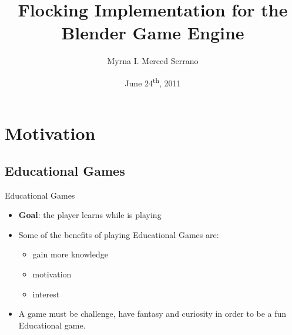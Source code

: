 \documentclass[red]{beamer}
\title[Flocking Implementation for the Blender Game Engine]{Flocking Implementation for the Blender Game Engine}
\author{Myrna I. Merced Serrano}
\institute{\textbf{Adviser:} Dr. Gordon Erlebacher}
\date{June 24\textsuperscript{th}, 2011}
\begin{document}
\begin{frame}
	\titlepage
\end{frame}

\begin{frame}
	\tableofcontents
\end{frame}

\section{Motivation}

\subsection{Educational Games}
\begin{frame}{Educational Games}
	\begin{itemize}
		\pause \item \textbf{Goal}: the player learns while is playing
		\pause \item Some of the benefits of playing Educational Games are:
			\begin{itemize}
				\pause \item gain more knowledge
				\pause \item motivation
				\pause \item interest
			\end{itemize}
		\pause \item A game must be challenge, have fantasy and curiosity in order to be a fun Educational game.
	\end{itemize}	
\end{frame}

\end{document}
